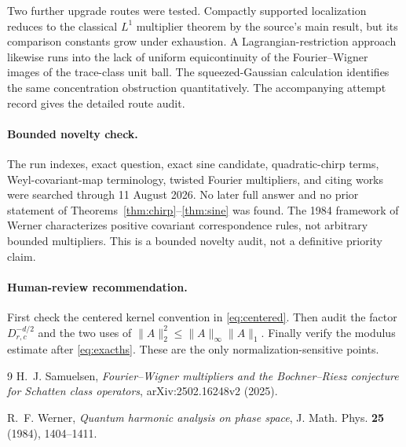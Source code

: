 \documentclass[11pt]{article}
\begin{document}
Two further upgrade routes were tested.  Compactly supported localization
reduces to the classical $L^1$ multiplier theorem by the source's main result,
but its comparison constants grow under exhaustion.  A Lagrangian-restriction
approach likewise runs into the lack of uniform equicontinuity of the
Fourier--Wigner images of the trace-class unit ball.  The squeezed-Gaussian
calculation identifies the same concentration obstruction quantitatively.
The accompanying attempt record gives the detailed route audit.

\paragraph{Bounded novelty check.}
The run indexes, exact question, exact sine candidate, quadratic-chirp terms,
Weyl-covariant-map terminology, twisted Fourier multipliers, and citing works
were searched through 11 August 2026.  No later full answer and no prior
statement of Theorems~\ref{thm:chirp}--\ref{thm:sine} was found.  The 1984
framework of Werner \cite{Werner} characterizes positive covariant
correspondence rules, not arbitrary bounded multipliers.  This is a bounded
novelty audit, not a definitive priority claim.

\paragraph{Human-review recommendation.}
First check the centered kernel convention in \eqref{eq:centered}.  Then audit
the factor $D_{r,c}^{-d/2}$ and the two uses of
$\|A\|_2^2\le\|A\|_\infty\|A\|_1$.  Finally verify the modulus estimate after
\eqref{eq:exacths}.  These are the only normalization-sensitive points.

\begin{thebibliography}{9}
H.~J. Samuelsen,
\emph{Fourier--Wigner multipliers and the Bochner--Riesz conjecture for
Schatten class operators}, arXiv:2502.16248v2 (2025).

R.~F. Werner,
\emph{Quantum harmonic analysis on phase space},
J. Math. Phys. \textbf{25} (1984), 1404--1411.
\end{thebibliography}
\end{document}
